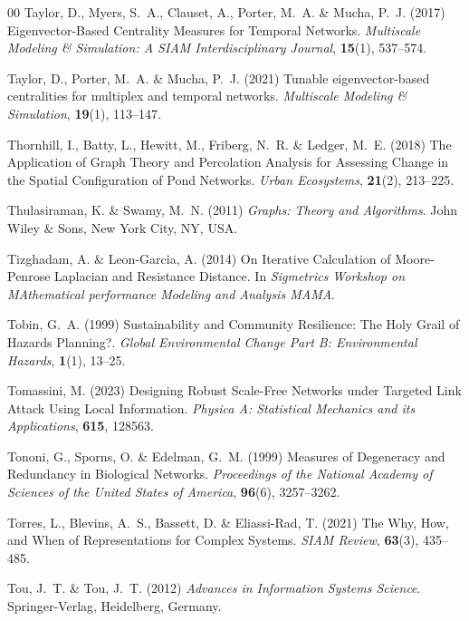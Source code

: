 \documentclass{comnet-mod}
\begin{document}
\begin{thebibliography}{00}
Taylor, D., Myers, S.~A., Clauset, A., Porter, M.~A. {\&} Mucha, P.~J. (2017)
  {Eigenvector-Based Centrality Measures for Temporal Networks}. {\em
  {Multiscale Modeling \& Simulation: A SIAM Interdisciplinary Journal}},
  \textbf{15}(1), 537--574.

Taylor, D., Porter, M.~A. {\&} Mucha, P.~J. (2021)  Tunable eigenvector-based
  centralities for multiplex and temporal networks. {\em {Multiscale Modeling
  \& Simulation}}, \textbf{19}(1), 113--147.

Thornhill, I., Batty, L., Hewitt, M., Friberg, N.~R. {\&} Ledger, M.~E. (2018)
  {The Application of Graph Theory and Percolation Analysis for Assessing
  Change in the Spatial Configuration of Pond Networks}. {\em {Urban
  Ecosystems}}, \textbf{21}(2), 213--225.

Thulasiraman, K. {\&} Swamy, M.~N. (2011) {\em {Graphs: {{Theory}} and
  {{Algorithms}}}}.
{John Wiley \& Sons}, {New York City, NY, USA}.

Tizghadam, A. {\&} {Leon-Garcia}, A. (2014)  {On Iterative Calculation of
  Moore-Penrose Laplacian and Resistance Distance}. In {\em {Sigmetrics
  Workshop on MAthematical performance Modeling and Analysis {{MAMA}}}}.

Tobin, G.~A. (1999)  {Sustainability and Community Resilience: {{The}} Holy
  Grail of Hazards Planning?}. {\em {Global Environmental Change Part B:
  Environmental Hazards}}, \textbf{1}(1), 13--25.

Tomassini, M. (2023)  {Designing Robust Scale-Free Networks under Targeted Link
  Attack Using Local Information}. {\em {Physica A: Statistical Mechanics and
  its Applications}}, \textbf{615}, 128563.

Tononi, G., Sporns, O. {\&} Edelman, G.~M. (1999)  {Measures of Degeneracy and
  Redundancy in Biological Networks}. {\em {Proceedings of the National Academy
  of Sciences of the United States of America}}, \textbf{96}(6), 3257--3262.

Torres, L., Blevins, A.~S., Bassett, D. {\&} {Eliassi-Rad}, T. (2021)  {The
  {{Why}}, {{How}}, and {{When}} of {{Representations}} for {{Complex
  Systems}}}. {\em {SIAM Review}}, \textbf{63}(3), 435--485.

Tou, J.~T. {\&} Tou, J.~T. (2012) {\em {Advances in Information Systems
  Science}}.
{Springer-Verlag}, {Heidelberg, Germany}.


\end{thebibliography}
\end{document}
